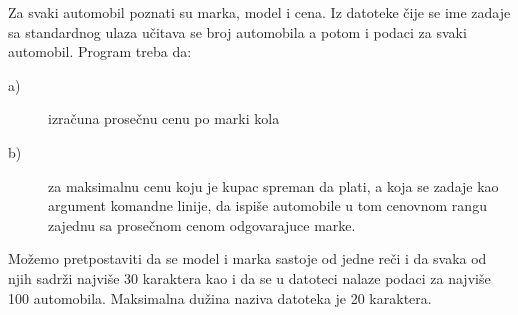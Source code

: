 \documentclass{article}
\begin{document}
\begin{z}
  Za svaki automobil poznati su marka, model i cena. Iz datoteke \v cije
  se ime zadaje sa standardnog ulaza u\v citava se broj automobila a potom
  i podaci za svaki automobil. Program treba da:
  \begin{description}
  \item[a)] izra\v cuna prose\v cnu cenu po marki kola
  \item[b)] za maksimalnu cenu koju je kupac spreman da plati, a koja se zadaje
  kao argument komandne linije, da ispi\v se automobile u tom cenovnom
  rangu zajednu sa prose\v cnom cenom odgovarajuce marke.
  \end{description}
  
  Mo\v zemo pretpostaviti da se model i marka sastoje od jedne re\v ci i 
  da svaka od njih sadr\v zi najvi\v se 30 karaktera kao i da se u datoteci
  nalaze podaci za najvi\v se 100 automobila. Maksimalna du\v zina naziva datoteka je 20 karaktera.
\end{z}
\end{document}
